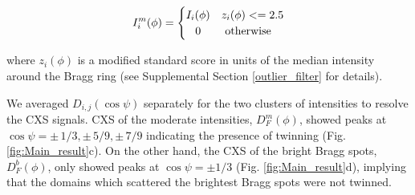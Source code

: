 \documentclass [12pt,fleqn]{article}
\begin{document}
\[
 I^m_i(\phi) =
  \begin{cases} 
      \hfill I_i(\phi)    \hfill &  z_i(\phi) <= 2.5 \\
      \hfill 0 \hfill & \text{ otherwise} \\
  \end{cases}
\]

where $z_i(\phi)$ is a modified standard score in units of the median intensity around the Bragg ring (see Supplemental Section \ref{outlier_filter} for details). 

We averaged $D_{i,j}(\cos \psi)$ separately for the two clusters of intensities to resolve the CXS signals. CXS of the moderate intensities, $D^m_{F}(\phi)$, showed peaks at $\cos \psi = \pm\,  1/3, \pm\, 5/9, \pm\, 7/9$ indicating the presence of twinning (Fig. \ref{fig:Main_result}c). On the other hand, the CXS of the bright Bragg spots, $D^b_{F}(\phi)$, only showed peaks at $\cos \psi = \pm 1/3$ (Fig. \ref{fig:Main_result}d), implying that the domains which scattered the brightest Bragg spots were not twinned.
\end{document}
